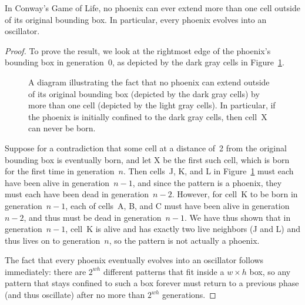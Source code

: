 \begin{theorem}\label{thm:phoenix_oscillate}
	In Conway's Game of Life, no phoenix can ever extend more than one cell outside of its original bounding box. In particular, every phoenix evolves into an oscillator.
\end{theorem}
\begin{proof}
	To prove the result, we look at the rightmost edge of the phoenix's bounding box in generation~$0$, as depicted by the dark gray cells in Figure~\ref{fig:phoenix_proof_1}.
	
	\begin{figure}[!htb]
		\centering{}
		\caption{A diagram illustrating the fact that no phoenix can extend outside of its original bounding box (depicted by the dark gray cells) by more than one cell (depicted by the light gray cells). In particular, if the phoenix is initially confined to the dark gray cells, then cell~X can never be born.}\label{fig:phoenix_proof_1}
	\end{figure}
	
	Suppose for a contradiction that some cell at a distance of~2 from the original bounding box is eventually born, and let X be the first such cell, which is born for the first time in generation~$n$. Then cells~J, K, and L in Figure~\ref{fig:phoenix_proof_1} must each have been alive in generation~$n-1$, and since the pattern is a phoenix, they must each have been dead in generation~$n-2$. However, for cell~K to be born in generation~$n-1$, each of cells~A, B, and C must have been alive in generation~$n-2$, and thus must be dead in generation~$n-1$. We have thus shown that in generation~$n-1$, cell~K is alive and has exactly two live neighbors (J and L) and thus lives on to generation~$n$, so the pattern is not actually a phoenix.
	
	The fact that every phoenix eventually evolves into an oscillator follows immediately: there are $2^{wh}$ different patterns that fit inside a $w \times h$ box, so any pattern that stays confined to such a box forever must return to a previous phase (and thus oscillate) after no more than $2^{wh}$ generations.
\end{proof}


